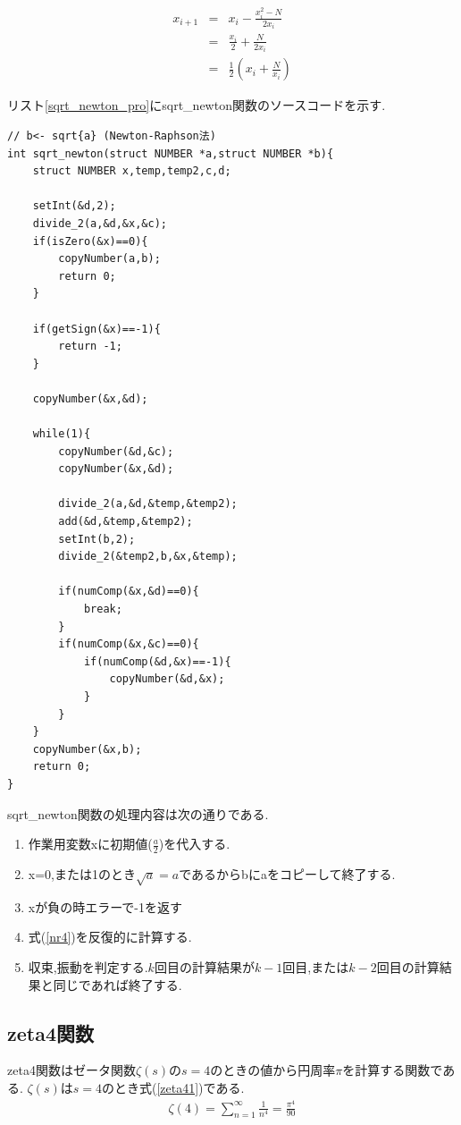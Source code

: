 \documentclass[a4j] {jarticle}
\begin{document}
        \begin{eqnarray}
          x_{i+1} &=& x_i - \frac{x_i^2 -N}{2x_i}\\
          &=& \frac{x_i}{2} + \frac{N}{2x_i}\\
          &=& \frac{1}{2} \left( x_i + \frac{N}{x_i} \right)
          \label{nr4}
        \end{eqnarray}

リスト\ref{sqrt_newton_pro}にsqrt\_newton関数のソースコードを示す.
        \begin{lstlisting}[basicstyle=\ttfamily\footnotesize, frame=single,label=sqrt_newton_pro,caption=sqrt\_newton関数のソースコード]
// b<- sqrt{a} (Newton-Raphson法)
int sqrt_newton(struct NUMBER *a,struct NUMBER *b){
    struct NUMBER x,temp,temp2,c,d;
    
    setInt(&d,2);
    divide_2(a,&d,&x,&c);
    if(isZero(&x)==0){
        copyNumber(a,b);
        return 0;
    }

    if(getSign(&x)==-1){
        return -1;
    }

    copyNumber(&x,&d);

    while(1){
        copyNumber(&d,&c);
        copyNumber(&x,&d);

        divide_2(a,&d,&temp,&temp2);
        add(&d,&temp,&temp2);
        setInt(b,2);
        divide_2(&temp2,b,&x,&temp);

        if(numComp(&x,&d)==0){
            break;
        }
        if(numComp(&x,&c)==0){
            if(numComp(&d,&x)==-1){
                copyNumber(&d,&x);
            }
        }   
    }
    copyNumber(&x,b);
    return 0;
}
        \end{lstlisting}
  sqrt\_newton関数の処理内容は次の通りである.
  \begin{enumerate}
    \item 作業用変数xに初期値($\frac{a}{2}$)を代入する.
    \item x=0,または1のとき$\sqrt{a}=a$であるからbにaをコピーして終了する.
    \item xが負の時エラーで-1を返す
    \item 式(\ref{nr4})を反復的に計算する.
    \item 収束,振動を判定する.$k$回目の計算結果が$k-1$回目,または$k-2$回目の計算結果と同じであれば終了する.
  \end{enumerate}

\subsection{zeta4関数}
zeta4関数はゼータ関数$\zeta(s)$の$s=4$のときの値から円周率$\pi$を計算する関数である.
$\zeta(s)$は$s=4$のとき式(\ref{zeta41})である.
\begin{eqnarray}
  \zeta(4) = \sum_{n=1}^{\infty} \frac{1}{n^4} = \frac{\pi^4}{90}
  \label{zeta41}
\end{eqnarray}
\end{document}
